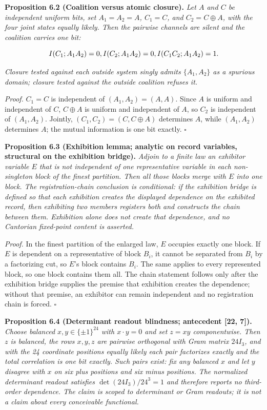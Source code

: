 \documentclass[10pt,twocolumn]{article}
\begin{document}
\textbf{Proposition 6.2 (Coalition versus atomic closure).} \emph{Let
\(A\) and \(C\) be independent uniform bits, set \(A_1 = A_2 = A\),
\(C_1 = C\), and \(C_2 = C \oplus A\), with the four joint states
equally likely. Then the pairwise channels are silent and the coalition
carries one bit:}

\[I(C_1; A_1 A_2) = 0, \\ I(C_2; A_1 A_2) = 0, \\ I(C_1 C_2; A_1 A_2) = 1.\]

\emph{Closure tested against each outside system singly admits
\(\{A_1, A_2\}\) as a spurious domain; closure tested against the
outside coalition refuses it.}

\emph{Proof.} \(C_1 = C\) is independent of \((A_1, A_2) = (A, A)\).
Since \(A\) is uniform and independent of \(C\), \(C \oplus A\) is
uniform and independent of \(A\), so \(C_2\) is independent of
\((A_1, A_2)\). Jointly, \((C_1, C_2) = (C, C \oplus A)\) determines
\(A\), while \((A_1, A_2)\) determines \(A\); the mutual information is
one bit exactly. \(\square\)

\textbf{Proposition 6.3 (Exhibition lemma; analytic on record variables,
structural on the exhibition bridge).} \emph{Adjoin to a finite law an
exhibitor variable \(E\) that is not independent of one representative
variable in each non-singleton block of the finest partition. Then all
those blocks merge with \(E\) into one block. The registration-chain
conclusion is conditional: if the exhibition bridge is defined so that
each exhibition creates the displayed dependence on the exhibited
record, then exhibiting two members registers both and constructs the
chain between them. Exhibition alone does not create that dependence,
and no Cantorian fixed-point content is asserted.}

\emph{Proof.} In the finest partition of the enlarged law, \(E\)
occupies exactly one block. If \(E\) is dependent on a representative of
block \(B_i\), it cannot be separated from \(B_i\) by a factorizing cut,
so \(E\)'s block contains \(B_i\). The same applies to every represented
block, so one block contains them all. The chain statement follows only
after the exhibition bridge supplies the premise that exhibition creates
the dependence; without that premise, an exhibitor can remain
independent and no registration chain is forced. \(\square\)

\textbf{Proposition 6.4 (Determinant readout blindness; antecedent
{[}22, 7{]}).} \emph{Choose balanced \(x, y \in \{\pm 1\}^{24}\) with
\(x \cdot y = 0\) and set \(z = xy\) componentwise. Then \(z\) is
balanced, the rows \(x, y, z\) are pairwise orthogonal with Gram matrix
\(24 I_3\), and with the 24 coordinate positions equally likely each
pair factorizes exactly and the total correlation is one bit exactly.
Such pairs exist: fix any balanced \(x\) and let \(y\) disagree with
\(x\) on six plus positions and six minus positions. The normalized
determinant readout satisfies \(\det(24 I_3)/24^3 = 1\) and therefore
reports no third-order dependence. The claim is scoped to determinant or
Gram readouts; it is not a claim about every conceivable functional.}
\end{document}

